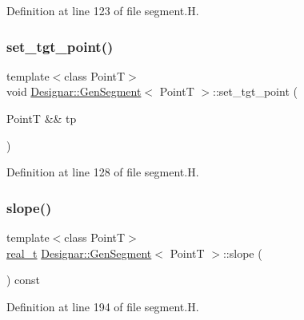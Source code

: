Definition at line 123 of file segment.\+H.

\mbox{\label{class_designar_1_1_gen_segment_a218a089156740da0d16ec68b62f957d6}} 
\subsubsection{\texorpdfstring{set\+\_\+tgt\+\_\+point()}{set\_tgt\_point()}\hspace{0.1cm}{\footnotesize\ttfamily [2/2]}}
{\footnotesize\ttfamily template$<$class PointT$>$ \\
void \hyperlink{class_designar_1_1_gen_segment}{Designar\+::\+Gen\+Segment}$<$ PointT $>$\+::set\+\_\+tgt\+\_\+point (\begin{DoxyParamCaption}\item[{PointT \&\&}]{tp }\end{DoxyParamCaption})\hspace{0.3cm}{\ttfamily [inline]}}



Definition at line 128 of file segment.\+H.

\mbox{\label{class_designar_1_1_gen_segment_a02652b0274b3b597fb588d83d424b4bd}} 
\subsubsection{\texorpdfstring{slope()}{slope()}}
{\footnotesize\ttfamily template$<$class PointT$>$ \\
\hyperlink{namespace_designar_aca2c32af26808dbec1f3a3071fad25ce}{real\+\_\+t} \hyperlink{class_designar_1_1_gen_segment}{Designar\+::\+Gen\+Segment}$<$ PointT $>$\+::slope (\begin{DoxyParamCaption}{ }\end{DoxyParamCaption}) const\hspace{0.3cm}{\ttfamily [inline]}}



Definition at line 194 of file segment.\+H.

